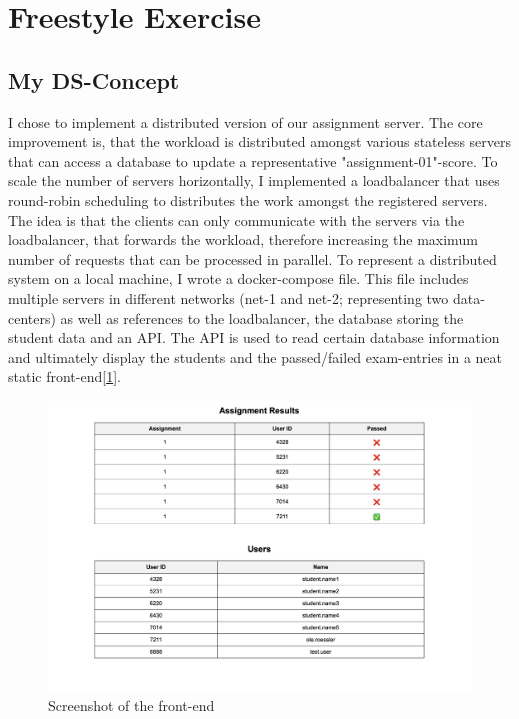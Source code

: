 \documentclass{article}
\begin{document}
\section{Freestyle Exercise}
\subsection{My DS-Concept}
I chose to implement a distributed version of our assignment server. 
The core improvement is, that the workload is distributed amongst various stateless servers that can access a database to update a representative "assignment-01"-score. To scale the number of servers horizontally, I implemented a loadbalancer that uses round-robin scheduling to distributes the work amongst the registered servers. The idea is that the clients can only communicate with the servers via the loadbalancer, that forwards the workload, therefore increasing the maximum number of requests that can be processed in parallel. 
To represent a distributed system on a local machine, I wrote a docker-compose file. This file includes multiple servers in different networks (net-1 and net-2; representing two data-centers) as well as references to the loadbalancer, the database storing the student data and an API. The API is used to read certain database information and ultimately display the students and the passed/failed exam-entries in a neat static front-end[\ref{fig:frontend}].

\begin{figure}[!hb]
    \centering
    \includegraphics[width=1\linewidth]{images/frontend_screenshot.png}
    \caption{Screenshot of the front-end}
    \label{fig:frontend}
\end{figure}
\end{document}
